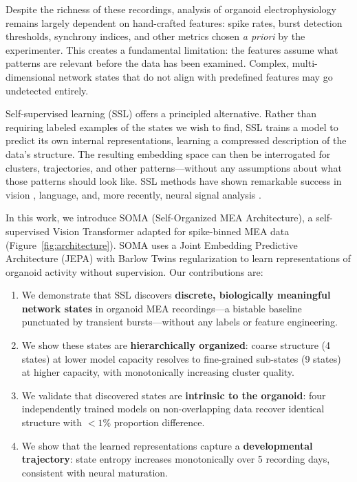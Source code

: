 \documentclass{article}
\begin{document}
Despite the richness of these recordings, analysis of organoid electrophysiology remains largely dependent on hand-crafted features: spike rates, burst detection thresholds, synchrony indices, and other metrics chosen \textit{a priori} by the experimenter. This creates a fundamental limitation: the features assume what patterns are relevant before the data has been examined. Complex, multi-dimensional network states that do not align with predefined features may go undetected entirely.

Self-supervised learning (SSL) offers a principled alternative. Rather than requiring labeled examples of the states we wish to find, SSL trains a model to predict its own internal representations, learning a compressed description of the data's structure. The resulting embedding space can then be interrogated for clusters, trajectories, and other patterns---without any assumptions about what those patterns should look like. SSL methods have shown remarkable success in vision \citep{assran2023ijepa}, language, and, more recently, neural signal analysis \citep{kostas2021bendr, dong2024brainjepa}.

In this work, we introduce SOMA (Self-Organized MEA Architecture), a self-supervised Vision Transformer adapted for spike-binned MEA data (Figure~\ref{fig:architecture}). SOMA uses a Joint Embedding Predictive Architecture (JEPA) with Barlow Twins regularization to learn representations of organoid activity without supervision. Our contributions are:

\begin{enumerate}
    \item We demonstrate that SSL discovers \textbf{discrete, biologically meaningful network states} in organoid MEA recordings---a bistable baseline punctuated by transient bursts---without any labels or feature engineering.
    \item We show these states are \textbf{hierarchically organized}: coarse structure (4 states) at lower model capacity resolves to fine-grained sub-states (9 states) at higher capacity, with monotonically increasing cluster quality.
    \item We validate that discovered states are \textbf{intrinsic to the organoid}: four independently trained models on non-overlapping data recover identical structure with $<1\%$ proportion difference.
    \item We show that the learned representations capture a \textbf{developmental trajectory}: state entropy increases monotonically over 5 recording days, consistent with neural maturation.
\end{enumerate}
\end{document}
